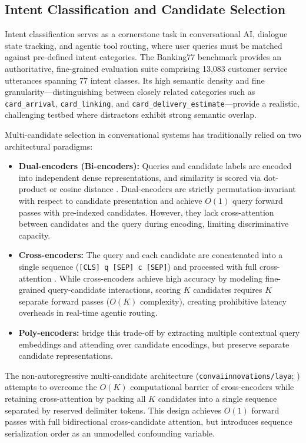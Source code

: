 \documentclass[10pt]{article}
\begin{document}
\subsection{Intent Classification and Candidate Selection}
Intent classification serves as a cornerstone task in conversational AI, dialogue state tracking, and agentic tool routing, where user queries must be matched against pre-defined intent categories. The Banking77 benchmark \citep{casanueva2020efficient} provides an authoritative, fine-grained evaluation suite comprising 13,083 customer service utterances spanning 77 intent classes. Its high semantic density and fine granularity---distinguishing between closely related categories such as \texttt{card\_arrival}, \texttt{card\_linking}, and \texttt{card\_delivery\_estimate}---provide a realistic, challenging testbed where distractors exhibit strong semantic overlap.

Multi-candidate selection in conversational systems has traditionally relied on two architectural paradigms:
\begin{itemize}
    \item \textbf{Dual-encoders (Bi-encoders):} Queries and candidate labels are encoded into independent dense representations, and similarity is scored via dot-product or cosine distance \citep{casanueva2020efficient}. Dual-encoders are strictly permutation-invariant with respect to candidate presentation and achieve $O(1)$ query forward passes with pre-indexed candidates. However, they lack cross-attention between candidates and the query during encoding, limiting discriminative capacity.
    \item \textbf{Cross-encoders:} The query and each candidate are concatenated into a single sequence (\texttt{[CLS] q [SEP] c [SEP]}) and processed with full cross-attention \citep{nogueira2019passage}. While cross-encoders achieve high accuracy by modeling fine-grained query-candidate interactions, scoring $K$ candidates requires $K$ separate forward passes ($O(K)$ complexity), creating prohibitive latency overheads in real-time agentic routing.
    \item \textbf{Poly-encoders:} \citet{humeau2020polyencoders} bridge this trade-off by extracting multiple contextual query embeddings and attending over candidate encodings, but preserve separate candidate representations.
\end{itemize}
The non-autoregressive multi-candidate architecture (\nolinkurl{convaiinnovations/laya}; \citealp{laya2024}) attempts to overcome the $O(K)$ computational barrier of cross-encoders while retaining cross-attention by packing all $K$ candidates into a single sequence separated by reserved delimiter tokens. This design achieves $O(1)$ forward passes with full bidirectional cross-candidate attention, but introduces sequence serialization order as an unmodelled confounding variable.
\end{document}
